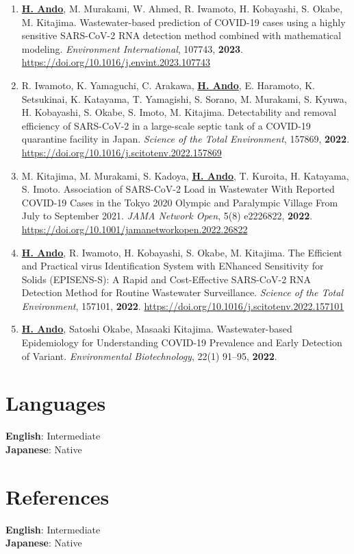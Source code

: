 \documentclass[11pt,a4paper]{article}
\begin{document}
\begin{enumerate}[label=\arabic*., series=pubcount, leftmargin=1.5em, nosep]
    \item \textbf{\underline{H. Ando}}, M. Murakami, W. Ahmed, R. Iwamoto, H. Kobayashi, S. Okabe, M. Kitajima. Wastewater-based prediction of COVID-19 cases using a highly sensitive SARS-CoV-2 RNA detection method combined with mathematical modeling. \textit{Environment International}, 107743, \textbf{2023}. \url{https://doi.org/10.1016/j.envint.2023.107743}
    \addtocounter{enumi}{-2}

    \item R. Iwamoto, K. Yamaguchi, C. Arakawa, \textbf{\underline{H. Ando}}, E. Haramoto, K. Setsukinai, K. Katayama, T. Yamagishi, S. Sorano, M. Murakami, S. Kyuwa, H. Kobayashi, S. Okabe, S. Imoto, M. Kitajima. Detectability and removal efficiency of SARS-CoV-2 in a large-scale septic tank of a COVID-19 quarantine facility in Japan. \textit{Science of the Total Environment}, 157869, \textbf{2022}. \url{https://doi.org/10.1016/j.scitotenv.2022.157869}
    \addtocounter{enumi}{-2}

    \item M. Kitajima, M. Murakami, S. Kadoya, \textbf{\underline{H. Ando}}, T. Kuroita, H. Katayama, S. Imoto. Association of SARS-CoV-2 Load in Wastewater With Reported COVID-19 Cases in the Tokyo 2020 Olympic and Paralympic Village From July to September 2021. \textit{JAMA Network Open}, 5(8) e2226822, \textbf{2022}. \url{https://doi.org/10.1001/jamanetworkopen.2022.26822}
    \addtocounter{enumi}{-2}

    \item \textbf{\underline{H. Ando}}, R. Iwamoto, H. Kobayashi, S. Okabe, M. Kitajima. The Efficient and Practical virus Identification System with ENhanced Sensitivity for Solids (EPISENS-S): A Rapid and Cost-Effective SARS-CoV-2 RNA Detection Method for Routine Wastewater Surveillance. \textit{Science of the Total Environment}, 157101, \textbf{2022}. \url{https://doi.org/10.1016/j.scitotenv.2022.157101}
    \addtocounter{enumi}{-2}

    \item \textbf{\underline{H. Ando}}, Satoshi Okabe, Masaaki Kitajima. Wastewater-based Epidemiology for Understanding COVID-19 Prevalence and Early Detection of Variant. \textit{Environmental Biotechnology}, 22(1) 91--95, \textbf{2022}.
\end{enumerate}



\section{Languages}
\textbf{English}: Intermediate \\
\textbf{Japanese}: Native

\vspace{10pt}

\section{References}
\textbf{English}: Intermediate \\
\textbf{Japanese}: Native

\vspace{10pt}
\end{document}
